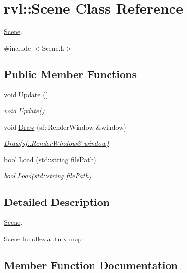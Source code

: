 \hypertarget{classrvl_1_1_scene}{}\section{rvl\+:\+:Scene Class Reference}
\label{classrvl_1_1_scene}


\hyperlink{classrvl_1_1_scene}{Scene}.  




{\ttfamily \#include $<$Scene.\+h$>$}

\subsection*{Public Member Functions}
\begin{DoxyCompactItemize}
\item 
void \hyperlink{classrvl_1_1_scene_ae6675125abb9ee6dc2e1be81aef3e270}{Update} ()
\begin{DoxyCompactList}\small\item\em void \hyperlink{classrvl_1_1_scene_ae6675125abb9ee6dc2e1be81aef3e270}{Update()} \end{DoxyCompactList}\item 
void \hyperlink{classrvl_1_1_scene_a62dd092ce10da061bb2bbb49eb0607db}{Draw} (sf\+::\+Render\+Window \&window)
\begin{DoxyCompactList}\small\item\em \hyperlink{classrvl_1_1_scene_a62dd092ce10da061bb2bbb49eb0607db}{Draw(sf\+::\+Render\+Window\& window)} \end{DoxyCompactList}\item 
bool \hyperlink{classrvl_1_1_scene_ab871b7005408e83aaf2df91051338c5f}{Load} (std\+::string file\+Path)
\begin{DoxyCompactList}\small\item\em bool \hyperlink{classrvl_1_1_scene_ab871b7005408e83aaf2df91051338c5f}{Load(std\+::string file\+Path)} \end{DoxyCompactList}\end{DoxyCompactItemize}


\subsection{Detailed Description}
\hyperlink{classrvl_1_1_scene}{Scene}. 

\hyperlink{classrvl_1_1_scene}{Scene} handles a .tmx map 

\subsection{Member Function Documentation}
\mbox{\label{classrvl_1_1_scene_a62dd092ce10da061bb2bbb49eb0607db}} 
